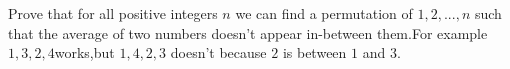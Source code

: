 Prove that for all positive integers $n$ we can find a permutation of {$1,2,...,n$} such that the average of two numbers doesn't appear in-between them.For example {$1,3,2,4$}works,but {$1,4,2,3$} doesn't because $2$ is between $1$ and $3$.